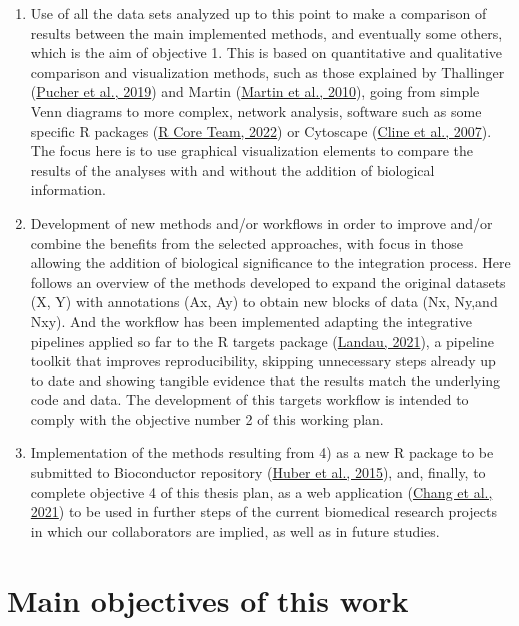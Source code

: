 \documentclass[a4paper, nobind]{templates/ociamthesis}
\begin{document}
\begin{enumerate}
\item
  Use of all the data sets analyzed up to this point to make a comparison of results between the main implemented methods, and eventually some others, which is the aim of objective 1. This is based on quantitative and qualitative comparison and visualization methods, such as those explained by Thallinger (\protect\hyperlink{ref-pucher_comparison_2019}{Pucher et al., 2019}) and Martin (\protect\hyperlink{ref-martin_bisogenet_2010}{Martin et al., 2010}), going from simple Venn diagrams to more complex, network analysis, software such as some specific R packages (\protect\hyperlink{ref-r_core_team_2022}{R Core Team, 2022}) or Cytoscape (\protect\hyperlink{ref-cline_integration_2007}{Cline et al., 2007}). The focus here is to use graphical visualization elements to compare the results of the analyses with and without the addition of biological information.
\item
  Development of new methods and/or workflows in order to improve and/or combine the benefits from the selected approaches, with focus in those allowing the addition of biological significance to the integration process. Here follows an overview of the methods developed to expand the original datasets (X, Y) with annotations (Ax, Ay) to obtain new blocks of data (Nx, Ny,and Nxy). And the workflow has been implemented adapting the integrative pipelines applied so far to the R targets package (\protect\hyperlink{ref-landau_targets_2021}{Landau, 2021}), a pipeline toolkit that improves reproducibility, skipping unnecessary steps already up to date and showing tangible evidence that the results match the underlying code and data. The development of this targets workflow is intended to comply with the objective number 2 of this working plan.
\item
  Implementation of the methods resulting from 4) as a new R package to be submitted to Bioconductor repository (\protect\hyperlink{ref-huber_orchestrating_2015}{Huber et al., 2015}), and, finally, to complete objective 4 of this thesis plan, as a web application (\protect\hyperlink{ref-shiny_2021}{Chang et al., 2021}) to be used in further steps of the current biomedical research projects in which our collaborators are implied, as well as in future studies.
\end{enumerate}

\hypertarget{main-objectives-of-this-work}{%
\section{Main objectives of this work}\label{main-objectives-of-this-work}}
\end{document}
